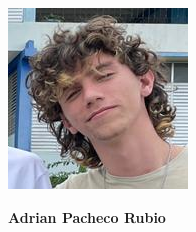 \begin{minipage}{0.2\textwidth}
	\includegraphics[width=\linewidth]{img/concursantes/adrian.png} %
\end{minipage}
\hfill
\begin{minipage}{0.7\textwidth}
	\textbf{Adrian Pacheco Rubio}
	
\end{minipage}


